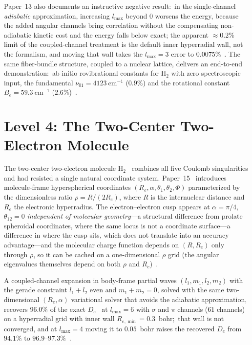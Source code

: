 \documentclass[aps,pra,twocolumn,superscriptaddress,longbibliography]{revtex4-2}
\begin{document}
Paper~13 also documents an instructive negative result:\ in the
single-channel \emph{adiabatic} approximation, increasing $l_{\max}$ beyond $0$
worsens the energy, because the added angular channels bring correlation
without the compensating non-adiabatic kinetic cost and the energy falls
below exact; the apparent ${\approx}0.2\%$ limit of the coupled-channel
treatment is the default inner hyperradial wall, not the formalism, and
moving that wall takes the $l_{\max}=3$ error to
$0.0075\%$~\cite{loutey_paper13}.
The same fiber-bundle structure, coupled to a nuclear lattice, delivers
an end-to-end demonstration:\ ab initio rovibrational constants for
$\mathrm{H}_2$ with zero spectroscopic input, the fundamental
$\nu_{01} = 4123~\mathrm{cm}^{-1}$ ($0.9\%$) and the rotational
constant $B_e = 59.3~\mathrm{cm}^{-1}$ ($2.6\%$)~\cite{loutey_paper13}.

\section{Level 4: The Two-Center Two-Electron Molecule}
\label{sec:level4}

The two-center two-electron molecule $\mathrm{H}_2$~\cite{james1933} combines all five
Coulomb singularities and had resisted a single natural coordinate
system.  Paper~15~\cite{loutey_paper15} introduces molecule-frame
hyperspherical coordinates $(R_e, \alpha, \theta_1, \theta_2, \Phi)$
parameterized by the dimensionless ratio $\rho = R/(2R_e)$, where $R$
is the internuclear distance and $R_e$ the electronic hyperradius.  The
electron--electron cusp appears at $\alpha = \pi/4$, $\theta_{12} = 0$
\emph{independent of molecular geometry}---a structural difference from
prolate spheroidal coordinates, where the same locus is not a coordinate
surface---a difference in where the cusp sits, which does not translate
into an accuracy advantage---and the molecular charge function depends on $(R, R_e)$
only through $\rho$, so it can be cached on a one-dimensional $\rho$ grid
(the angular eigenvalues themselves depend on both $\rho$ and
$R_e$)~\cite{loutey_paper15}.

A coupled-channel expansion in body-frame partial waves $(l_1, m_1,
l_2, m_2)$ with the gerade constraint $l_1 + l_2$ even and $m_1 + m_2 =
0$, solved with the same two-dimensional $(R_e, \alpha)$ variational
solver that avoids the adiabatic approximation, recovers $96.0\%$ of
the exact $D_e$~\cite{kolos1968} at $l_{\max}=6$ with $\sigma$ and $\pi$ channels ($61$
channels) on a hyperradial grid with inner wall $R_{e,\min} = 0.3$~bohr;\
that wall is not converged, and at $l_{\max}=4$ moving it to $0.05$~bohr
raises the recovered $D_e$ from $94.1\%$ to
$96.9$--$97.3\%$~\cite{loutey_paper15}.
\end{document}
